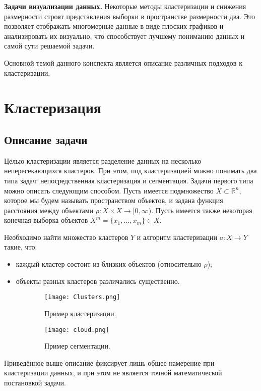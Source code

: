 \documentclass[10pt]{article}
\newcommand{\R}{\mathbb{R}}
\begin{document}
\textbf{Задачи визуализации данных.}
Некоторые методы кластеризации и снижения размерности строят представления выборки в пространстве размерности два. 
Это позволяет отображать многомерные данные в виде плоских графиков и анализировать их визуально, 
что способствует лучшему пониманию данных и самой сути решаемой задачи.

Основной темой данного конспекта является описание различных подходов к кластеризации.

\section{Кластеризация}
\subsection{Описание задачи}

Целью кластеризации является разделение данных на несколько непересекающихся кластеров. 
При этом, под кластеризацией можно понимать два типа задач: непосредственная кластеризация и сегментация.
Задачи первого типа можно описать следующим способом.
Пусть имеется подмножество $X \subset \R^n$, которое мы будем называть пространством объектов, 
и задана функция расстояния между объектами $\rho: X \times X \rightarrow [0, \infty)$.
Пусть имеется также некоторая конечная выборка объектов $X^m = \{x_1, \dots, x_m\} \in X$.

Необходимо найти множество кластеров $Y$ и алгоритм кластеризации $a: X \rightarrow Y$ такие, что:
	\begin{itemize}
		\item каждый кластер состоит из близких объектов (относительно $\rho$);
		\item объекты разных кластеров различались существенно.
	\end{itemize}

\begin{figure}[h]
	\centering
	\begin{subfigure}{0.4\textwidth}
		\texttt{[image: Clusters.png]}
		\caption{Пример кластеризации.}
		\label{fig:clusters}
	\end{subfigure}
\begin{subfigure}{0.4\textwidth}
		\texttt{[image: cloud.png]}
		\caption{Пример сегментации.}
		\label{fig:cloud}
	\end{subfigure}
	\caption{}
	\end{figure}

Приведённое выше описание фиксирует лишь общее намерение при кластеризации данных, и при этом не является точной математической постановкой задачи.
\end{document}
